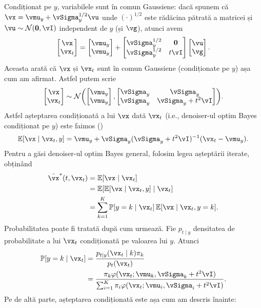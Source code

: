 \documentclass[../../book-main_ro.tex]{subfiles}
\begin{document}
\begin{example}
	Condiționat pe \(y\), variabilele sunt în comun Gaussiene: dacă spunem că \(\vx = \vmu_{y} + \vSigma_{y}^{1/2}\vu\) unde \((\cdot)^{1/2}\) este rădăcina pătrată a matricei și \(\vu \sim \dNorm(\vzero, \vI)\) independent de \(y\) (și \(\vg\)), atunci avem
	\begin{equation}
		\mat{\vx \\ \vx_{t}} = \mat{\vmu_{y} \\ \vmu_{y}} + \mat{\vSigma_{y}^{1/2} & \vzero \\ \vSigma_{y}^{1/2} & t\vI}\mat{\vu \\ \vg}.
	\end{equation}
	Aceasta arată că \(\vx\) și \(\vx_{t}\) sunt în comun Gaussiene (condiționate pe \(y\)) așa cum am afirmat. Astfel putem scrie
	\begin{equation}
		\mat{\vx \\ \vx_{t}} \sim \dNorm\rp{\mat{\vmu_{y} \\ \vmu_{y}}, \mat{\vSigma_{y} & \vSigma_{y} \\ \vSigma_{y} & \vSigma_{y} + t^{2}\vI}}.
	\end{equation}
	Astfel așteptarea condiționată a lui \(\vx\) dată \(\vx_{t}\) (i.e., denoiser-ul
	optim Bayes condiționat pe \(y\)) este faimos
	()
	\begin{equation}
		\Ex[\vx \mid \vx_{t}, y] = \vmu_{y} + \vSigma_{y}(\vSigma_{y} + t^{2}\vI)^{-1}(\vx_{t} - \vmu_{y}).
	\end{equation}
	Pentru a găsi denoiser-ul optim Bayes general, folosim legea așteptării iterate, obținând
	\begin{align}
		\bar{\vx}^{\ast}(t, \vx_{t})
		&= \Ex[\vx \mid \vx_{t}] \\ 
		&= \Ex[\Ex[\vx \mid \vx_{t}, y] \mid \vx_{t}] \\ 
		&= \sum_{k = 1}^{K}\Pr[y = k \mid \vx_{t}]\Ex[\vx \mid \vx_{t}, y = k].
	\end{align}
	Probabilitatea poate fi tratată după cum urmează. Fie \(p_{t \mid y}\) densitatea de probabilitate a lui \(\vx_{t}\) condiționată pe valoarea lui \(y\). Atunci
	\begin{align}
		\Pr[y = k \mid \vx_{t}]
		&= \frac{p_{t \mid y}(\vx_{t} \mid k)\pi_{k}}{p_{t}(\vx_{t})} \\ 
		&= \frac{\pi_{k}\phi(\vx_{t} ; \vmu_{k}, \vSigma_{k}
		+ t^{2}\vI)}{\sum_{i = 1}^{K}\pi_{i}\phi(\vx_{t} ; \vmu_{i}, \vSigma_{i} + t^{2}\vI)}.
	\end{align}
	Pe de altă parte, așteptarea condiționată este așa cum am descris înainte:

\end{example}
\end{document}
